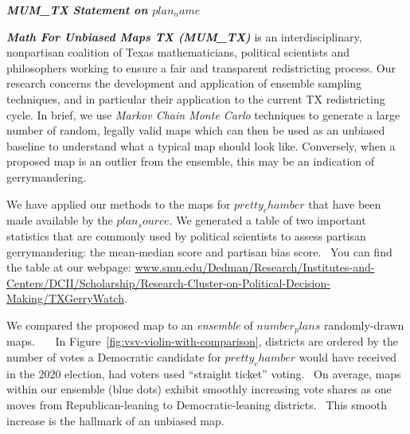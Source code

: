 \documentclass[letterpaper]{article}
\title{}
\author{Barreiro, Andrea}
\newcommand\textstyleInternetlink[1]{\textcolor[rgb]{0.019607844,0.3882353,0.75686276}{#1}}
\newcommand{\VAR}[1] {$#1$}
\begin{document}
\textbf{\textit{MUM\_TX Statement on \VAR{plan_name}}}

\bigskip

\textbf{\textit{Math For Unbiased Maps TX (MUM\_TX) }}is\textbf{\textit{ }}an interdisciplinary, nonpartisan coalition
of Texas mathematicians, political scientists and philosophers working to ensure a fair and transparent redistricting
process. Our research concerns the development and application of ensemble sampling techniques, and in particular their
application to the current TX redistricting cycle. In brief, we use \textit{Markov Chain Monte Carlo }techniques to
generate a large number of random, legally valid maps which can then be used as an unbiased baseline to understand what
a typical map should look like. Conversely, when a proposed map is an outlier from the ensemble, this may be an
indication of gerrymandering.

\bigskip

We have applied our methods to the maps for \VAR{pretty_chamber} that have been made available by the \VAR{plan_source}. 
We generated a table of two important statistics that are commonly used by political scientists to assess
partisan gerrymandering: the mean-median score and partisan bias score. \ You can find the table at our webpage:
\href{http://www.smu.edu/Dedman/Research/Institutes-and-Centers/DCII/Scholarship/Research-Cluster-on-Political-Decision-Making/TXGerryWatch}{\textstyleInternetlink{www.smu.edu/Dedman/Research/Institutes-and-Centers/DCII/Scholarship/Research-Cluster-on-Political-Decision-Making/TXGerryWatch}}.



\bigskip

We compared the proposed map to an \textit{ensemble} of \VAR{number_plans} randomly-drawn maps. \ \ \ In Figure~\ref{fig:vsv-violin-with-comparison}, districts are ordered by the number of votes a Democratic
candidate for \VAR{pretty_chamber} would have received in the 2020 election, had voters used ``straight ticket'' voting. \ On
average, maps within our ensemble (blue dots) exhibit smoothly increasing vote shares as one moves from
Republican-leaning to Democratic-leaning districts. \ This smooth increase is the hallmark of an unbiased map. 
\end{document}
